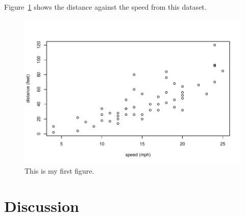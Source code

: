 \documentclass[12pt]{article}
\begin{document}
Figure~\ref{fig:cars} shows the distance against the speed from this dataset.

\begin{figure}
  \centering
  \includegraphics[width=\textwidth]{cars.pdf}
  \caption{This is my first figure.}
  \label{fig:cars}
\end{figure}

\section{Discussion}
\label{sec:disc}



\end{document}
